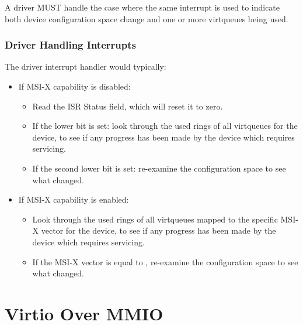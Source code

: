 
A driver MUST handle the case where the same interrupt is used to indicate
both device configuration space change and one or more virtqueues being used.

\subsubsection{Driver Handling Interrupts}\label{sec:Virtio Transport Options / Virtio Over PCI Bus / PCI-specific Initialization And Device Operation / Driver Handling Interrupts}
The driver interrupt handler would typically:

\begin{itemize}
  \item If MSI-X capability is disabled:
    \begin{itemize}
      \item Read the ISR Status field, which will reset it to zero.
      \item If the lower bit is set:
        look through the used rings of all virtqueues for the
        device, to see if any progress has been made by the device
        which requires servicing.
      \item If the second lower bit is set:
        re-examine the configuration space to see what changed.
    \end{itemize}
  \item If MSI-X capability is enabled:
    \begin{itemize}
      \item
        Look through the used rings of
        all virtqueues mapped to the specific MSI-X vector for the
        device, to see if any progress has been made by the device
        which requires servicing.
      \item
        If the MSI-X vector is equal to ,
        re-examine the configuration space to see what changed.
    \end{itemize}
\end{itemize}

\section{Virtio Over MMIO}\label{sec:Virtio Transport Options / Virtio Over MMIO}

